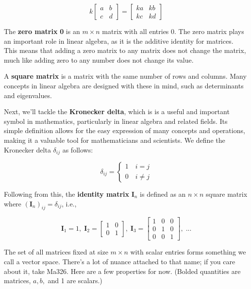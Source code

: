 \documentclass[
  letterpaper,
  DIV=11,
  numbers=noendperiod]{scrreprt}
\begin{document}
\[ k \begin{bmatrix}
    a & b \\ c & d
\end{bmatrix} = \begin{bmatrix}
    ka & kb \\ kc & kd
\end{bmatrix}\]

The \textbf{zero matrix} \textbf{0} is an \(m\times n\) matrix with all
entries 0. The zero matrix plays an important role in linear algebra, as
it is the additive identity for matrices. This means that adding a zero
matrix to any matrix does not change the matrix, much like adding zero
to any number does not change its value.

A \textbf{square matrix} is a matrix with the same number of rows and
columns. Many concepts in linear algebra are designed with these in
mind, such as determinants and eigenvalues.

Next, we'll tackle the \textbf{Kronecker delta}, which is is a useful
and important symbol in mathematics, particularly in linear algebra and
related fields. Its simple definition allows for the easy expression of
many concepts and operations, making it a valuable tool for
mathematicians and scientists. We define the Kronecker delta
\(\delta_{ij}\) as follows:

\begin{equation*}
    \delta_{ij} = \left\{ \begin{array}{ll}
        1 \quad i=j\\
        0 \quad i \neq j
    \end{array} \right.
\end{equation*}

Following from this, the \textbf{identity matrix} \(\textbf{I}_n\) is
defined as an \(n\times n\) square matrix where
\((\textbf{I}_n)_{ij} = \delta_{ij}\), i.e.,

\[\textbf{I}_1 = 1, \; \textbf{I}_2 = \begin{bmatrix}
    1 & 0 \\ 0 & 1
\end{bmatrix}, \; \textbf{I}_3 = \begin{bmatrix}
    1 & 0 & 0 \\ 0 & 1 & 0 \\ 0 & 0 & 1
\end{bmatrix}, \; ...\]

The set of all matrices fixed at size \(m \times n\) with scalar entries
forms something we call a vector space. There's a lot of nuance attached
to that name; if you care about it, take Ma326. Here are a few
properties for now. (Bolded quantities are matrices, \(a, b,\) and 1 are
scalars.)
\end{document}
